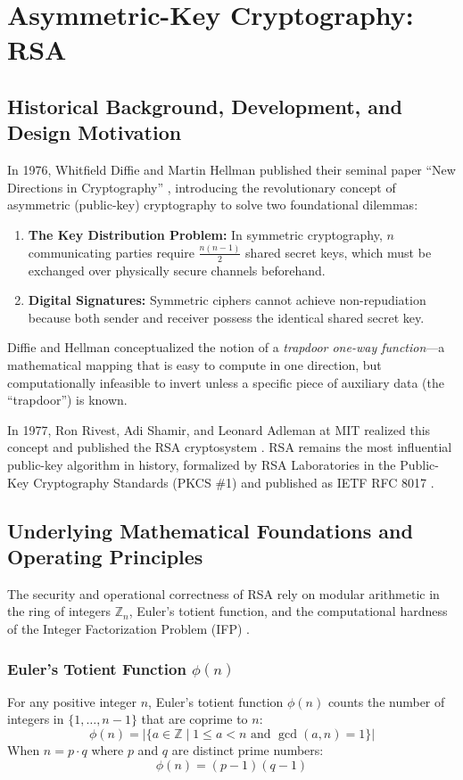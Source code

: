 \chapter{Asymmetric-Key Cryptography: RSA}
\label{ch:rsa}

\section{Historical Background, Development, and Design Motivation}
In 1976, Whitfield Diffie and Martin Hellman published their seminal paper ``New Directions in Cryptography'' \cite{diffiehellman1976}, introducing the revolutionary concept of asymmetric (public-key) cryptography to solve two foundational dilemmas:
\begin{enumerate}
    \item \textbf{The Key Distribution Problem:} In symmetric cryptography, $n$ communicating parties require $\frac{n(n-1)}{2}$ shared secret keys, which must be exchanged over physically secure channels beforehand.
    \item \textbf{Digital Signatures:} Symmetric ciphers cannot achieve non-repudiation because both sender and receiver possess the identical shared secret key.
\end{enumerate}
Diffie and Hellman conceptualized the notion of a \emph{trapdoor one-way function}---a mathematical mapping that is easy to compute in one direction, but computationally infeasible to invert unless a specific piece of auxiliary data (the ``trapdoor'') is known.

In 1977, Ron Rivest, Adi Shamir, and Leonard Adleman at MIT realized this concept and published the RSA cryptosystem \cite{rsa1978}. RSA remains the most influential public-key algorithm in history, formalized by RSA Laboratories in the Public-Key Cryptography Standards (PKCS \#1) and published as IETF RFC 8017 \cite{rfc8017}.

\section{Underlying Mathematical Foundations and Operating Principles}
The security and operational correctness of RSA rely on modular arithmetic in the ring of integers $\mathbb{Z}_n$, Euler's totient function, and the computational hardness of the Integer Factorization Problem (IFP) \cite{katzlindell}.

\subsection{Euler's Totient Function $\phi(n)$}
For any positive integer $n$, Euler's totient function $\phi(n)$ counts the number of integers in $\{1, \dots, n-1\}$ that are coprime to $n$:
\begin{equation}
\phi(n) = |\{ a \in \mathbb{Z} \mid 1 \le a < n \text{ and } \gcd(a, n) = 1 \}|
\end{equation}
When $n = p \cdot q$ where $p$ and $q$ are distinct prime numbers:
\begin{equation}
\phi(n) = (p - 1)(q - 1)
\end{equation}

